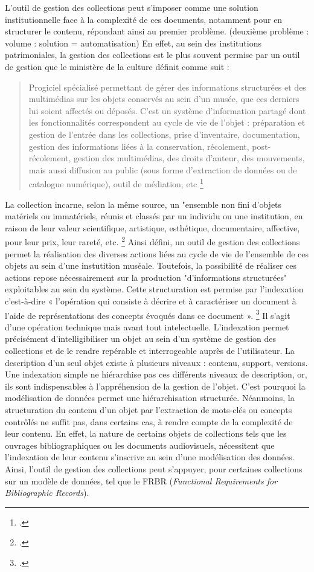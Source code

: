L'outil de gestion des collections peut s'imposer comme une solution institutionnelle face à la complexité de ces documents, notamment pour en structurer le contenu, répondant ainsi au premier problème. (deuxième problème : volume : solution = automatisation) En effet, au sein des institutions patrimoniales, la gestion des collections est le plus souvent permise par un outil de gestion que le ministère de la culture définit comme suit : \begin{quote}
	Progiciel spécialisé permettant de gérer des informations structurées et des multimédias sur les objets conservés au sein d’un musée, que ces derniers lui soient affectés ou déposés. C’est un système d’information partagé dont les fonctionnalités correspondent au cycle de vie de l’objet : préparation et gestion de l’entrée dans les collections, prise d’inventaire, documentation, gestion des informations liées à la conservation, récolement, post-récolement, gestion des multimédias, des droits d’auteur, des mouvements, mais aussi diffusion au public (sous forme d'extraction de données ou de catalogue numérique), outil de médiation, etc \footcite{zotero-item-766}
\end{quote}

La collection incarne, selon la même source, un "ensemble non fini d'objets matériels ou immatériels, réunis et classés par un individu ou une institution, en raison de leur valeur scientifique, artistique, esthétique, documentaire, affective, pour leur prix, leur rareté, etc. \footcite{zotero-item-766} Ainsi défini, un outil de gestion des collections permet la réalisation des diverses actions liées au cycle de vie de l'ensemble de ces objets au sein d'une instutition muséale. Toutefois, la possibilité de réaliser ces actions repose nécessairement sur la production "d'informations structurées" exploitables au sein du système. Cette structuration est permise par l'indexation c'est-à-dire « l’opération qui consiste à décrire et à caractériser un document à l’aide de représentations des concepts évoqués dans ce document ». \footcite{zotero-item-767} Il s'agit d'une opération technique mais avant tout intelectuelle. L'indexation permet précisément d'intelligibiliser un objet au sein d'un système de gestion des collections et de le rendre repérable et interrogeable auprès de l'utilisateur. 
La description d'un seul objet existe à plusieurs niveaux : contenu, support, versions. Une indexation simple ne hiérarchise pas ces différents niveaux de description, or, ils sont indispensables à l'appréhension de la gestion de l'objet. C'est pourquoi la modélisation de données permet une hiérarchisation structurée. 
Néanmoins, la structuration du contenu d'un objet par l'extraction de mots-clés ou concepts contrôlés ne suffit pas, dans certains cas, à rendre compte de la complexité de leur contenu. En effet, la nature de certains objets de collections tels que les ouvrages bibliographiques ou les documents audiovisuels, nécessitent que l'indexation de leur contenu s'inscrive au sein d'une modélisation des données. Ainsi, l'outil de gestion des collections peut s'appuyer, pour certaines collections sur un modèle de données, tel que le FRBR (\textit{Functional Requirements for Bibliographic Records}). 

